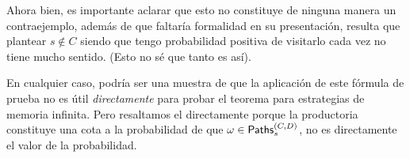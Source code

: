 

Ahora bien, es importante aclarar que esto no constituye de ninguna manera un
contraejemplo, además de que faltaría formalidad en su presentación, resulta
que plantear $s \notin C$ siendo que tengo probabilidad positiva de visitarlo
cada vez no tiene mucho sentido. (Esto no sé que tanto es así).

En cualquier caso, podría ser una muestra de que la aplicación de este fórmula
de prueba no es útil \textit{directamente} para probar el teorema para
estrategias de memoria infinita. Pero resaltamos el directamente porque la
productoria constituye una cota a la probabilidad de que $\omega \in
	\textsf{Paths}_s^{(C,D)}$, no es directamente el valor de la probabilidad.

